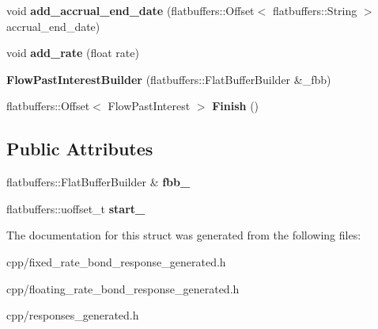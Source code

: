 \begin{DoxyCompactItemize}
void {\bfseries add\+\_\+accrual\+\_\+end\+\_\+date} (flatbuffers\+::\+Offset$<$ flatbuffers\+::\+String $>$ accrual\+\_\+end\+\_\+date)
\item 
\mbox{\label{structquantra_1_1FlowPastInterestBuilder_a77f2d659532b9504b97b24d8ff7d9d49}} 
void {\bfseries add\+\_\+rate} (float rate)
\item 
\mbox{\label{structquantra_1_1FlowPastInterestBuilder_a01ab89dddcba7e96fcc8a8625b57f8b7}} 
{\bfseries Flow\+Past\+Interest\+Builder} (flatbuffers\+::\+Flat\+Buffer\+Builder \&\+\_\+fbb)
\item 
\mbox{\label{structquantra_1_1FlowPastInterestBuilder_a969d3272b1a5281a15cba0c526065a04}} 
flatbuffers\+::\+Offset$<$ Flow\+Past\+Interest $>$ {\bfseries Finish} ()
\end{DoxyCompactItemize}
\subsection*{Public Attributes}
\begin{DoxyCompactItemize}
\item 
\mbox{\label{structquantra_1_1FlowPastInterestBuilder_aa87ce53e8854cde2cba02ed307b2e3a2}} 
flatbuffers\+::\+Flat\+Buffer\+Builder \& {\bfseries fbb\+\_\+}
\item 
\mbox{\label{structquantra_1_1FlowPastInterestBuilder_a0b4674c7b2597b847375e0bc776a84d8}} 
flatbuffers\+::uoffset\+\_\+t {\bfseries start\+\_\+}
\end{DoxyCompactItemize}


The documentation for this struct was generated from the following files\+:\begin{DoxyCompactItemize}
\item 
cpp/fixed\+\_\+rate\+\_\+bond\+\_\+response\+\_\+generated.\+h\item 
cpp/floating\+\_\+rate\+\_\+bond\+\_\+response\+\_\+generated.\+h\item 
cpp/responses\+\_\+generated.\+h\end{DoxyCompactItemize}
